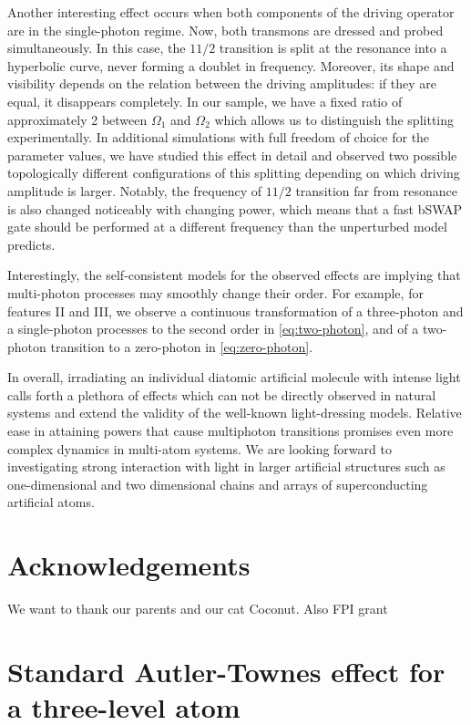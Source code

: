 \documentclass[%
 pra,
 amsmath,amssymb,
 reprint,%
]{revtex4-1}
\begin{document}
Another interesting effect occurs when both 
components of the driving operator are in the 
single-photon regime. Now, both transmons are 
dressed and probed simultaneously. In this case, 
the $11/2$ transition is split at the resonance 
into a hyperbolic curve, never forming a doublet 
in frequency. Moreover, its shape and visibility 
depends on the relation between the driving 
amplitudes: if they are equal, it disappears 
completely. In our sample, we have a fixed ratio 
of approximately 2 between $\Omega_1$ and 
$\Omega_2$ which allows us to distinguish the 
splitting experimentally. In additional 
simulations with full freedom of choice for the 
parameter values, we have studied this effect in 
detail and observed two possible topologically 
different configurations of this splitting 
depending on which driving amplitude is larger. 
Notably, the frequency of $11/2$ transition far 
from resonance is also changed noticeably with 
changing power, which means that a fast bSWAP 
gate should be performed at a different frequency 
than the unperturbed model predicts. 

Interestingly, the self-consistent models for the 
observed effects are implying that multi-photon 
processes may smoothly change their order. For 
example, for features II and III, we observe a 
continuous transformation of a three-photon and a 
single-photon processes to the second order in 
\autoref{eq:two-photon}, and of a two-photon 
transition to a zero-photon in 
\autoref{eq:zero-photon}.

In overall, irradiating an individual diatomic artificial molecule with intense light calls forth a plethora of effects which can not be directly observed in natural systems and extend the validity of the well-known light-dressing models. Relative ease in attaining powers that cause multiphoton transitions promises even more complex dynamics in multi-atom systems. We are looking forward to investigating strong interaction with light in larger artificial structures such as one-dimensional and two dimensional chains and arrays of superconducting artificial atoms.

\section{Acknowledgements}

We want to thank our parents and our cat Coconut. Also FPI grant

\appendix

\section{Standard Autler-Townes effect for a three-level atom} \label{sec:3-level-at}
\end{document}
